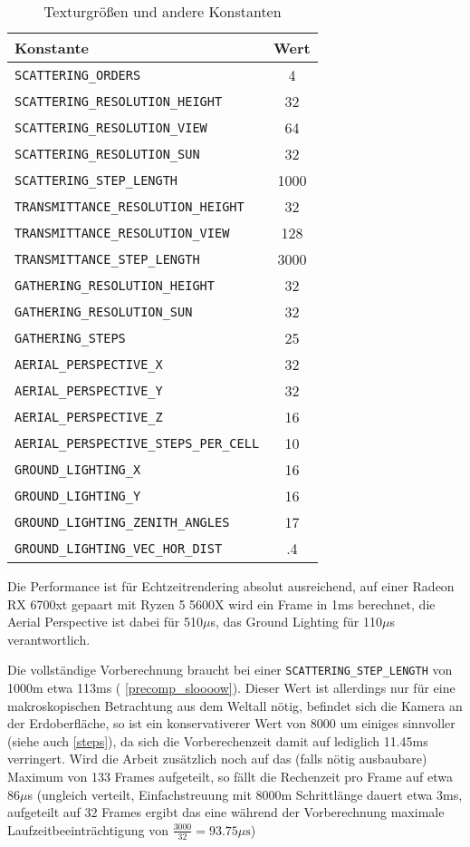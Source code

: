 \begin{table}
	\centering
	\begin{tabular}{| l | c |}
	\hline
	Konstante & Wert\\ \hline
	\texttt{SCATTERING\_ORDERS} & 4 \\
	\texttt{SCATTERING\_RESOLUTION\_HEIGHT} & 32 \\
	\texttt{SCATTERING\_RESOLUTION\_VIEW} & 64 \\
	\texttt{SCATTERING\_RESOLUTION\_SUN} & 32 \\
	\texttt{SCATTERING\_STEP\_LENGTH} & 1000 \\ \hline
	\texttt{TRANSMITTANCE\_RESOLUTION\_HEIGHT} & 32 \\
	\texttt{TRANSMITTANCE\_RESOLUTION\_VIEW} & 128 \\
	\texttt{TRANSMITTANCE\_STEP\_LENGTH} & 3000 \\ \hline
	\texttt{GATHERING\_RESOLUTION\_HEIGHT} & 32 \\
	\texttt{GATHERING\_RESOLUTION\_SUN} & 32 \\
	\texttt{GATHERING\_STEPS} & 25 \\ \hline
	\texttt{AERIAL\_PERSPECTIVE\_X} & 32 \\
	\texttt{AERIAL\_PERSPECTIVE\_Y} & 32 \\
	\texttt{AERIAL\_PERSPECTIVE\_Z} & 16 \\
	\texttt{AERIAL\_PERSPECTIVE\_STEPS\_PER\_CELL} & 10 \\ \hline
	\texttt{GROUND\_LIGHTING\_X} & 16 \\
	\texttt{GROUND\_LIGHTING\_Y} & 16 \\
	\texttt{GROUND\_LIGHTING\_ZENITH\_ANGLES} & 17 \\
	\texttt{GROUND\_LIGHTING\_VEC\_HOR\_DIST} & .4 \\ \hline
	\end{tabular}
\caption{Texturgrößen und andere Konstanten}
\label{consts}
\end{table}

Die Performance ist für Echtzeitrendering absolut ausreichend, auf einer Radeon RX 6700xt gepaart mit Ryzen 5 5600X wird
ein Frame in 1ms berechnet, die Aerial Perspective ist dabei für 510$\mu$s, das Ground Lighting für 110$\mu$s
verantwortlich.

Die vollständige Vorberechnung braucht bei einer \texttt{SCATTERING\_STEP\_LENGTH} von 1000m etwa 113ms (
\cref{precomp_sloooow}). Dieser Wert ist allerdings nur für eine makroskopischen Betrachtung aus dem Weltall nötig,
befindet sich die Kamera an der Erdoberfläche, so ist ein konservativerer Wert von 8000 um einiges sinnvoller (siehe
auch \cref{steps}), da sich die Vorberechenzeit damit auf lediglich 11.45ms verringert. Wird die Arbeit zusätzlich noch
auf das (falls nötig ausbaubare) Maximum von 133 Frames aufgeteilt, so fällt die Rechenzeit pro Frame auf etwa 86$\mu$s
(ungleich verteilt, Einfachstreuung mit 8000m Schrittlänge dauert etwa 3ms, aufgeteilt auf 32 Frames ergibt das eine
während der Vorberechnung maximale Laufzeitbeeinträchtigung von $\frac{3000}{32}=93.75\mu\text{s}$)

